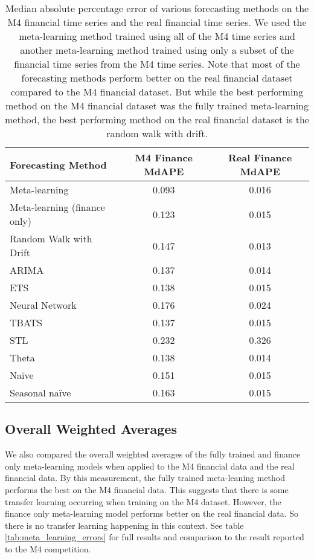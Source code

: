 \documentclass[a4paper,12pt]{article}
\theoremstyle{definition}
\begin{document}
\begin{table}
  \centering
  \begin{tabular}{| l | c | c |}
    \hline
    \textbf{Forecasting Method} & \textbf{M4 Finance MdAPE} & \textbf{Real Finance MdAPE} \\ \hline
    Meta-learning & 0.093 & 0.016 \\ \hline
    Meta-learning (finance only) & 0.123 & 0.015 \\ \hline
    Random Walk with Drift & 0.147 & 0.013 \\ \hline
    ARIMA & 0.137 & 0.014 \\ \hline
    ETS & 0.138 & 0.015 \\ \hline
    Neural Network & 0.176 & 0.024 \\ \hline
    TBATS & 0.137 & 0.015 \\ \hline
    STL & 0.232 & 0.326 \\ \hline
    Theta & 0.138 & 0.014 \\ \hline
    Na{\"i}ve & 0.151 & 0.015 \\ \hline
    Seasonal na{\"i}ve & 0.163 & 0.015 \\ \hline
  \end{tabular}
  \caption{Median absolute percentage error of various forecasting methods on the M4 financial time series and the real financial time series. We used the meta-learning method trained using all of the M4 time series and another meta-learning method trained using only a subset of the financial time series from the M4 time series. Note that most of the forecasting methods perform better on the real financial dataset compared to the M4 financial dataset. But while the best performing method on the M4 financial dataset was the fully trained meta-learning method, the best performing method on the real financial dataset is the random walk with drift.}
  \label{tab:finance_only_results}
\end{table}

\subsection{Overall Weighted Averages}
We also compared the overall weighted averages of the fully trained and finance only meta-learning models when applied to the M4 financial data and the real financial data. By this measurement, the fully trained meta-leaning method performs the best on the M4 financial data. This suggests that there is some transfer learning occurring when training on the M4 dataset. However, the finance only meta-learning model performs better on the real financial data. So there is no transfer learning happening in this context. See table \ref{tab:meta_learning_errors} for full results and comparison to the result reported to the M4 competition.
\end{document}
